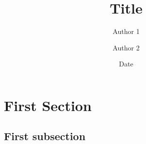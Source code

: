 \documentclass[pagesize,english,DIV=calc,footinclude=false
]{scrartcl}
\title{Title}
\author{Author 1 \and Author 2}
\date{Date}
\begin{document}
\maketitle



\section{First Section}\label{first-section}

\subsection{First subsection}\label{first-subsection}
\end{document}
